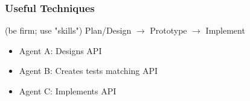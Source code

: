 \documentclass[aspectratio=169,hyperref=colorlinks]{beamer}
\begin{document}
\begin{frame}
  \frametitle{Useful Techniques}
  \summary{}

  \begin{itemize}
   (be firm; use "skills")
   Plan/Design $\rightarrow$ Prototype $\rightarrow$ Implement
    \begin{itemize}
    \item Agent A: Designs API
    \item Agent B: Creates tests matching API
    \item Agent C: Implements API
    \end{itemize}
  \end{itemize}

\end{frame}
\end{document}
